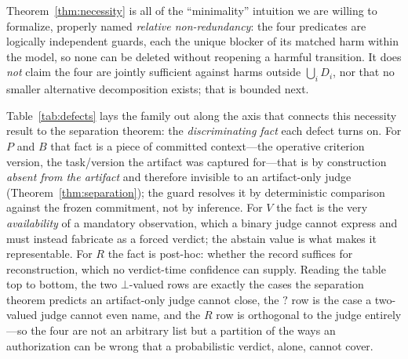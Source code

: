 \documentclass[sigconf,anonymous,review]{acmart}
\begin{document}
Theorem~\ref{thm:necessity} is all of the ``minimality'' intuition we are willing to formalize, properly named \emph{relative non-redundancy}: the four predicates are logically independent guards, each the unique blocker of its matched harm within the model, so none can be deleted without reopening a harmful transition. It does \emph{not} claim the four are jointly sufficient against harms outside $\bigcup_i D_i$, nor that no smaller alternative decomposition exists; that is bounded next.

Table~\ref{tab:defects} lays the family out along the axis that connects this necessity result to the separation theorem: the \emph{discriminating fact} each defect turns on. For $P$ and $B$ that fact is a piece of committed context---the operative criterion version, the task/version the artifact was captured for---that is by construction \emph{absent from the artifact} and therefore invisible to an artifact-only judge (Theorem~\ref{thm:separation}); the guard resolves it by deterministic comparison against the frozen commitment, not by inference. For $V$ the fact is the very \emph{availability} of a mandatory observation, which a binary judge cannot express and must instead fabricate as a forced verdict; the abstain value is what makes it representable. For $R$ the fact is post-hoc: whether the record suffices for reconstruction, which no verdict-time confidence can supply. Reading the table top to bottom, the two $\bot$-valued rows are exactly the cases the separation theorem predicts an artifact-only judge cannot close, the $?$ row is the case a two-valued judge cannot even name, and the $R$ row is orthogonal to the judge entirely---so the four are not an arbitrary list but a partition of the ways an authorization can be wrong that a probabilistic verdict, alone, cannot cover.
\end{document}
